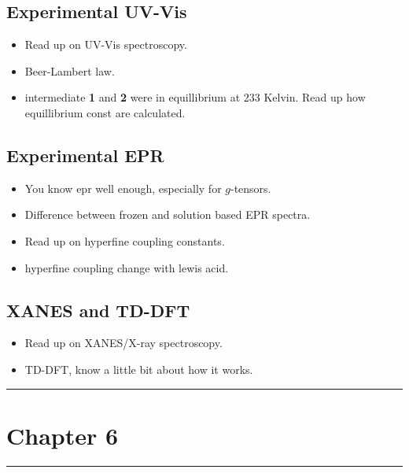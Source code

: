 \documentclass{article}
\newcommand*\sepline
{
  \begin{center}
    \rule[1ex]{.7\textwidth}{.5pt}
  \end{center}
}
\begin{document}
\subsection{Experimental UV-Vis}

\begin{itemize}
    \item Read up on UV-Vis spectroscopy.
    \item Beer-Lambert law.
    \item intermediate \textbf{1} and \textbf{2} were in equillibrium at 233 Kelvin. Read up how equillibrium const are calculated.
\end{itemize}

\subsection{Experimental EPR}

\begin{itemize}
    \item You know epr well enough, especially for $g$-tensors.
    \item Difference between frozen and solution based EPR spectra.
    \item Read up on hyperfine coupling constants.
    \item hyperfine coupling change with lewis acid.
\end{itemize}

\subsection{XANES and TD-DFT}

\begin{itemize}
    \item Read up on XANES/X-ray spectroscopy.
    \item TD-DFT, know a little bit about how it works.
\end{itemize}

\sepline

\section{Chapter 6}

\sepline

\end{document}
